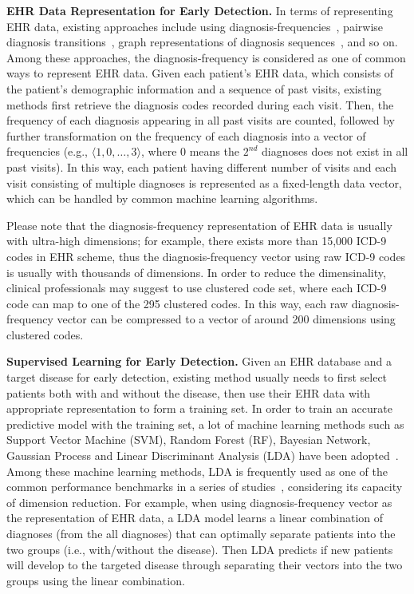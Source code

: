 \documentclass[journal,compsoc]{IEEEtran}
\begin{document}
\textbf{EHR Data Representation for Early Detection.} 
In terms of representing EHR data, existing approaches include using diagnosis-frequencies~\cite{sun2012supervised,7091853,personalized2015}, pairwise diagnosis transitions~\cite{zhang_mseq_2015,jensen2001mining}, graph representations of diagnosis sequences~\cite{liu_temporal_2015}, and so on.
Among these approaches, the diagnosis-frequency is considered as one of common ways to represent EHR data.
Given each patient's EHR data, which consists of the patient's demographic information and a sequence of past visits, existing methods first retrieve the diagnosis codes recorded during each visit.
Then, the frequency of each diagnosis appearing in all past visits are counted, followed by further transformation on the frequency of each diagnosis into a vector of frequencies (e.g., $\langle 1, 0, \dots, 3\rangle$, where 0 means the $2^{nd}$ diagnoses does not exist in all past visits).
In this way, each patient having different number of visits and each visit consisting of multiple diagnoses is represented as a fixed-length data vector, which can be handled by common machine learning algorithms.


Please note that the diagnosis-frequency representation of EHR data is usually with ultra-high dimensions; for example, there exists more than 15,000 ICD-9 codes in EHR scheme, thus the diagnosis-frequency vector using raw ICD-9 codes is usually with thousands of dimensions.
In order to reduce the dimensinality, clinical professionals may suggest to use clustered code set, where each ICD-9 code can map to  one of the 295 clustered codes.
In this way, each raw diagnosis-frequency vector can be compressed to a vector of around 200 dimensions using clustered codes.


\textbf{Supervised Learning for Early Detection.} 
Given an EHR database and a target disease for early detection, existing method usually needs to first select patients both with and without the disease, then use their EHR data with appropriate representation to form a training set.
In order to train an accurate predictive model with the training set, a lot of machine learning methods such as Support Vector Machine (SVM), Random Forest (RF), Bayesian Network, Gaussian Process and Linear Discriminant Analysis (LDA) have been adopted~\cite{sun2012supervised,7091853,personalized2015,zhang_mseq_2015,jensen2001mining,liu_temporal_2015,cazzanti_local_2007}.
Among these machine learning methods, LDA is frequently used as one of the common performance benchmarks in a series of studies~\cite{cazzanti_local_2007,zhang_mseq_2015,kalina2013selecting,karlsson2014handling,wang2014clinical}, considering its capacity of dimension reduction.
For example, when using diagnosis-frequency vector as the representation of EHR data, a LDA model learns a linear combination of diagnoses (from the all diagnoses) that can optimally separate patients into the two groups (i.e., with/without the disease).
Then LDA predicts if new patients will develop to the targeted disease through separating their vectors into the two groups using the linear combination.
\end{document}
